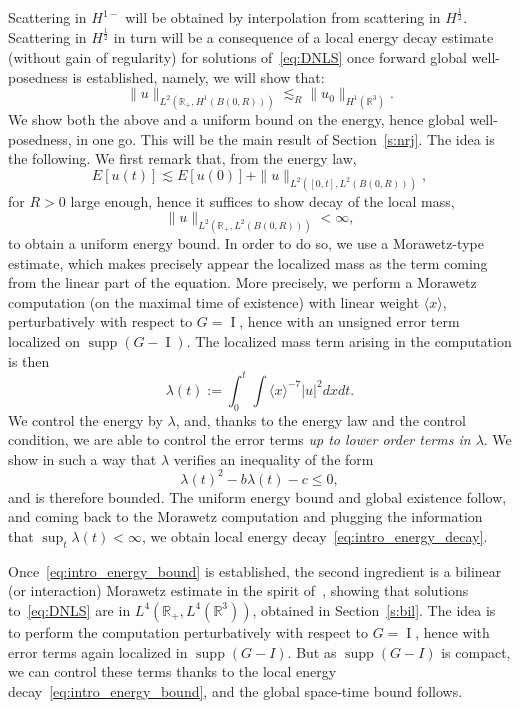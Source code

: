 \documentclass[10pt]{amsart}
\theoremstyle{definition}\newtheorem{defi}[theo]{Definition}\newtheorem{rema}[theo]{Remark}\newtheorem{exam}[theo]{Example}\newtheorem{exem}[theo]{Example}\newtheorem{nota}[theo]{Notation}
\newcommand*\R{\mathbb{R}}
\DeclareMathOperator{\I}{I}
\DeclareMathOperator{\supp}{supp}
\begin{document}
Scattering in $H^{1-}$ will be obtained by interpolation from scattering in $H^{\frac 12}$. Scattering in $H^{\frac 12}$ in turn will be a consequence of a local energy decay estimate (without gain of regularity) for solutions of~\eqref{eq:DNLS} once forward global well-posedness is established, namely, we will show that:
\begin{equation}\label{eq:intro_energy_decay}
\| u \|_{L^2\left(\R_+, H^1(B(0, R))\right)} \lesssim_R \| u_0 \|_{H^1(\R^3)}.
\end{equation}
We show both the above and a uniform bound on the energy, hence global well-posedness, in one go. This will be the main result of Section~\ref{s:nrj}. The idea is the following. We first remark that, from the energy law,
\begin{equation}\label{eq:intro_energy_bound}
E[u(t)] \lesssim E[u(0)] + \| u \|_{L^2\left([0, t], L^2(B(0, R))\right)},
\end{equation}
for $R>0$ large enough, hence it suffices to show decay of the local mass,
\[
\| u \|_{L^2\left(\R_+, L^2(B(0, R))\right)}<\infty,
\]
to obtain a uniform energy bound. In order to do so, we use a Morawetz-type estimate, which makes precisely appear the localized mass as the term coming from the linear part of the equation. More precisely, we perform a Morawetz computation (on the maximal time of existence) with linear weight $\langle x \rangle$, perturbatively with respect to $G = \I$, hence with an unsigned error term localized on $\supp(G-\I)$. The localized mass term arising in the computation is then
\[
\lambda(t) := \int_0^t \int \langle x\rangle^{-7}|u|^2 dxdt.
\]
We control the energy by $\lambda$, and, thanks to the energy law and the control condition, we are able to control the error terms \emph{up to lower order terms in $\lambda$}. We show in such a way that $\lambda$ verifies an inequality of the form
\[
\lambda(t)^2 - b\lambda(t) - c \leq 0,
\]
and is therefore bounded. The uniform energy bound and global existence follow, and coming back to the Morawetz computation and plugging the information that $\sup_t \lambda(t) < \infty$, we obtain local energy decay~\eqref{eq:intro_energy_decay}.

Once~\eqref{eq:intro_energy_bound} is established, the second ingredient is a bilinear (or interaction) Morawetz estimate in the spirit of~\cite{CoKeStTaTa04,PV1}, showing that solutions to~\eqref{eq:DNLS} are in $L^4(\R_+, L^4(\R^3))$, obtained in Section~\ref{s:bil}. The idea is to perform the computation perturbatively with respect to $G= \I$, hence with error terms again localized in $\supp(G-I)$. But as $\supp(G-I)$ is compact, we can control these terms thanks to the local energy decay~\eqref{eq:intro_energy_bound}, and the global space-time bound follows.
\end{document}
